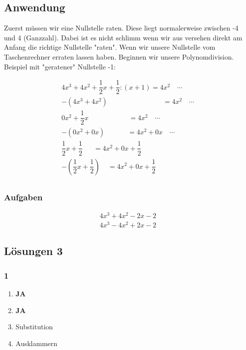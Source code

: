 \documentclass[11pt,a4paper]{article}
\begin{document}
\subsection{Anwendung}
Zuerst müssen wir eine Nullstelle raten. Diese liegt normalerweise zwischen -4 und 4 (Ganzzahl). Dabei ist es nicht schlimm wenn wir aus versehen direkt am Anfang die richtige Nullstelle "raten". Wenn wir unsere Nullstelle vom Taschenrechner erraten lassen haben. Beginnen wir unsere Polynomdivision. Beispiel mit "geratener" Nullstelle -1:

\begin{eqnarray}
4x^3 + 4x^2 + \dfrac{1}{2} x + \dfrac{1}{2} : (x + 1) = 4x^2\quad \cdots \\
-(4x^3 + 4x^2) \qquad \qquad \qquad \qquad = 4x^2 \quad \cdots \\
0x^2 + \dfrac{1}{2} x \; \; \; \quad \qquad \qquad = 4x^2 \quad \cdots \\
-(0x^2 + 0x) \; \quad \qquad = 4x^2 + 0x \quad \cdots \\
\dfrac{1}{2} x + \dfrac{1}{2} \; \; \quad = 4x^2 + 0x + \dfrac{1}{2} \\
-(\dfrac{1}{2} x + \dfrac{1}{2}) \; \; \; \; = 4x^2 + 0x + \dfrac{1}{2} \\
\end{eqnarray}

\subsubsection*{Aufgaben}

\begin{eqnarray}
4x^3 + 4x^2 - 2x - 2\\
4x^3 - 4x^2 + 2x - 2
\end{eqnarray}

\newpage

\subsection{Lösungen 3}

\subsubsection*{1}

\begin{enumerate}
\item \textbf{JA}
\item \textbf{JA}
\item Substitution
\item Ausklammern
\end{enumerate}
\end{document}

